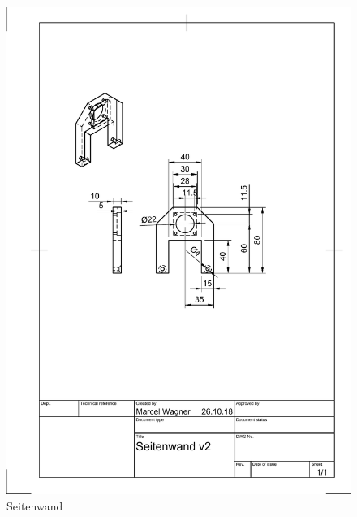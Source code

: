 \begin{figure}
	\includegraphics[width=\textwidth]{images/Mechanik/Seitenwand}
	\caption{Seitenwand}
\end{figure}

